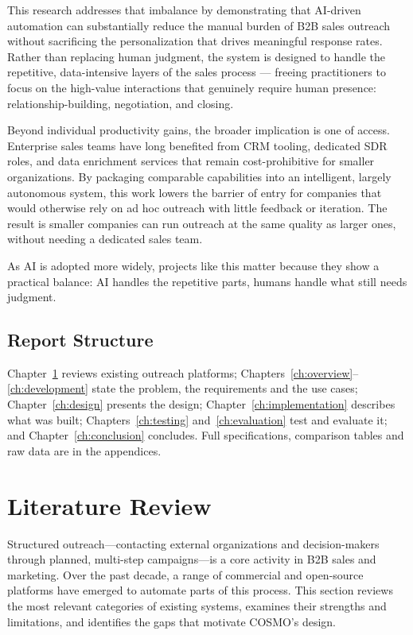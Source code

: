 \documentclass[a4paper]{article}
\begin{document}
This research addresses that imbalance by demonstrating that AI-driven automation can substantially reduce the manual burden of B2B sales outreach without sacrificing the personalization that drives meaningful response rates. Rather than replacing human judgment, the system is designed to handle the repetitive, data-intensive layers of the sales process — freeing practitioners to focus on the high-value interactions that genuinely require human presence: relationship-building, negotiation, and closing.

Beyond individual productivity gains, the broader implication is one of access. Enterprise sales teams have long benefited from CRM tooling, dedicated SDR roles, and data enrichment services that remain cost-prohibitive for smaller organizations. By packaging comparable capabilities into an intelligent, largely autonomous system, this work lowers the barrier of entry for companies that would otherwise rely on ad hoc outreach with little feedback or iteration. The result is smaller companies can run outreach at the same quality as larger
ones, without needing a dedicated sales team.

As AI is adopted more widely, projects like this matter because they show a practical balance: AI handles the repetitive parts, humans handle what still needs judgment.

\subsection{Report Structure}

Chapter~\ref{ch:literature} reviews existing outreach platforms;
Chapters~\ref{ch:overview}--\ref{ch:development} state the problem, the
requirements and the use cases; Chapter~\ref{ch:design} presents the design;
Chapter~\ref{ch:implementation} describes what was built;
Chapters~\ref{ch:testing} and~\ref{ch:evaluation} test and evaluate it; and
Chapter~\ref{ch:conclusion} concludes. Full specifications, comparison tables
and raw data are in the appendices.

\newpage
\section{Literature Review}
\label{ch:literature}

Structured outreach---contacting external organizations and 
decision-makers through planned, multi-step campaigns---is a core 
activity in B2B sales and marketing. Over the past decade, a range 
of commercial and open-source platforms have emerged to automate 
parts of this process. This section reviews the most relevant 
categories of existing systems, examines their strengths and 
limitations, and identifies the gaps that motivate COSMO's design.
\end{document}
